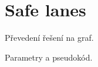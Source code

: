 \section{Safe lanes}\label{sec:safe_lanes}

Převedení řešení \citet{Dresner} na graf.

Parametry a pseudokód.

%
%
%
%
%
%
%
%
%
